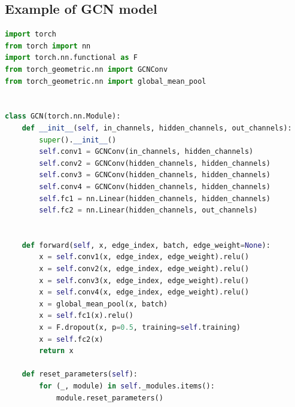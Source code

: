 \documentclass{article}
\begin{document}
\subsection*{Example of GCN model}

\begin{lstlisting}[language=Python]
import torch
from torch import nn
import torch.nn.functional as F
from torch_geometric.nn import GCNConv
from torch_geometric.nn import global_mean_pool


class GCN(torch.nn.Module):
    def __init__(self, in_channels, hidden_channels, out_channels):
        super().__init__()
        self.conv1 = GCNConv(in_channels, hidden_channels)
        self.conv2 = GCNConv(hidden_channels, hidden_channels)
        self.conv3 = GCNConv(hidden_channels, hidden_channels)
        self.conv4 = GCNConv(hidden_channels, hidden_channels)
        self.fc1 = nn.Linear(hidden_channels, hidden_channels)
        self.fc2 = nn.Linear(hidden_channels, out_channels)


    def forward(self, x, edge_index, batch, edge_weight=None):
        x = self.conv1(x, edge_index, edge_weight).relu()
        x = self.conv2(x, edge_index, edge_weight).relu()
        x = self.conv3(x, edge_index, edge_weight).relu()
        x = self.conv4(x, edge_index, edge_weight).relu()
        x = global_mean_pool(x, batch)
        x = self.fc1(x).relu()
        x = F.dropout(x, p=0.5, training=self.training)
        x = self.fc2(x)
        return x
    
    def reset_parameters(self):
        for (_, module) in self._modules.items():
            module.reset_parameters()

\end{lstlisting}
\end{document}

